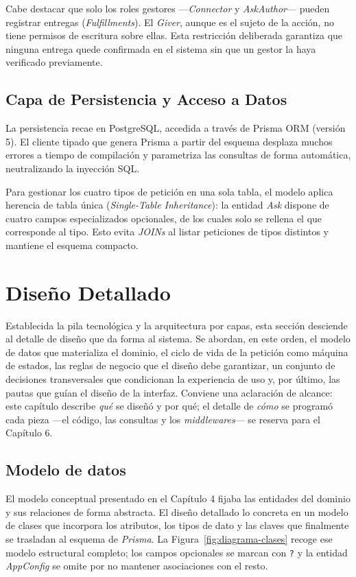 \documentclass[11pt,oneside,spanish,listoffigures,listoftables]{tfgetsinf}
\begin{document}
Cabe destacar que solo los roles gestores —\textit{Connector} y \textit{AskAuthor}— pueden registrar entregas (\textit{Fulfillments}). El \textit{Giver}, aunque es el sujeto de la acción, no tiene permisos de escritura sobre ellas. Esta restricción deliberada garantiza que ninguna entrega quede confirmada en el sistema sin que un gestor la haya verificado previamente.

\subsection{Capa de Persistencia y Acceso a Datos}
La persistencia recae en PostgreSQL, accedida a través de Prisma ORM (versión 5). El cliente tipado que genera Prisma a partir del esquema desplaza muchos errores a tiempo de compilación y parametriza las consultas de forma automática, neutralizando la inyección SQL.

Para gestionar los cuatro tipos de petición en una sola tabla, el modelo aplica herencia de tabla única (\textit{Single-Table Inheritance}): la entidad \textit{Ask} dispone de cuatro campos especializados opcionales, de los cuales solo se rellena el que corresponde al tipo. Esto evita \textit{JOINs} al listar peticiones de tipos distintos y mantiene el esquema compacto.

\section{Diseño Detallado}

Establecida la pila tecnológica y la arquitectura por capas, esta sección desciende al detalle de diseño que da forma al sistema. Se abordan, en este orden, el modelo de datos que materializa el dominio, el ciclo de vida de la petición como máquina de estados, las reglas de negocio que el diseño debe garantizar, un conjunto de decisiones transversales que condicionan la experiencia de uso y, por último, las pautas que guían el diseño de la interfaz. Conviene una aclaración de alcance: este capítulo describe \textit{qué} se diseñó y por qué; el detalle de \textit{cómo} se programó cada pieza —el código, las consultas y los \textit{middlewares}— se reserva para el Capítulo 6.

\subsection{Modelo de datos}

El modelo conceptual presentado en el Capítulo 4 fijaba las entidades del dominio y sus relaciones de forma abstracta. El diseño detallado lo concreta en un modelo de clases que incorpora los atributos, los tipos de dato y las claves que finalmente se trasladan al esquema de \textit{Prisma}. La Figura~\ref{fig:diagrama-clases} recoge ese modelo estructural completo; los campos opcionales se marcan con \texttt{?} y la entidad \textit{AppConfig} se omite por no mantener asociaciones con el resto.
\end{document}

